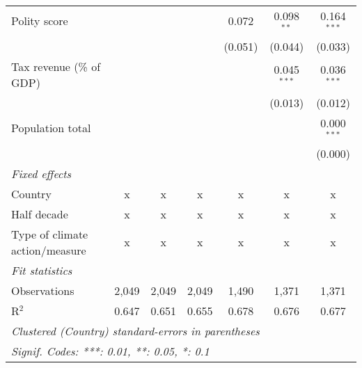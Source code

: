 \begin{tabular}{lcccccc}
   Polity score                                                     &              &                &                & 0.072          & 0.098$^{**}$   & 0.164$^{***}$\\   
                                                                    &              &                &                & (0.051)        & (0.044)        & (0.033)\\   
   Tax revenue (\% of GDP)                                          &              &                &                &                & 0.045$^{***}$  & 0.036$^{***}$\\   
                                                                    &              &                &                &                & (0.013)        & (0.012)\\   
   Population total                                                 &              &                &                &                &                & 0.000$^{***}$\\   
                                                                    &              &                &                &                &                & (0.000)\\   
   \emph{Fixed effects}\\
   Country                                                          & x            & x              & x              & x              & x              & x\\  
   Half decade                                                      & x            & x              & x              & x              & x              & x\\  
   Type of climate action/measure                                   & x            & x              & x              & x              & x              & x\\  
   \midrule \emph{Fit statistics}\\
   Observations                                                     & 2,049        & 2,049          & 2,049          & 1,490          & 1,371          & 1,371\\  
   R$^2$                                                            & 0.647        & 0.651          & 0.655          & 0.678          & 0.676          & 0.677\\  
   \midrule
   \multicolumn{7}{l}{\emph{Clustered (Country) standard-errors in parentheses}}\\
   \multicolumn{7}{l}{\emph{Signif. Codes: ***: 0.01, **: 0.05, *: 0.1}}\\
\end{tabular}
\par\endgroup


